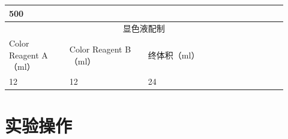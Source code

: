 \documentclass[UTF8,10pt,a4paper,fontset=fandol]{ctexart}
\newcommand{\fieldvalue}[1]{#1}
\newcommand{\handwritten}[1]{#1}
\begin{document}
\begin{center}
\begin{tabular}{|p{0.20\linewidth}|p{0.26\linewidth}|p{0.26\linewidth}|p{0.20\linewidth}|}
\fieldvalue{\handwritten{500}} & \\ \hline
\multicolumn{4}{|c|}{显色液配制} \\ \hline
Color Reagent A（ml） & Color Reagent B（ml） & 终体积（ml） & \\ \hline
\fieldvalue{\handwritten{12}} &
\fieldvalue{\handwritten{12}} &
\fieldvalue{\handwritten{24}} & \\ \hline
\end{tabular}
\end{center}

\section*{实验操作}
\end{document}
